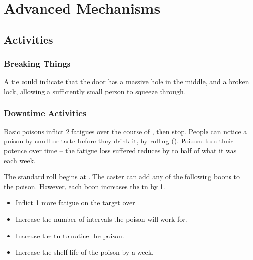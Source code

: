 \chapter{Advanced Mechanisms}

\label{skill_uses}

\section{Activities}

\begin{multicols}{2}

\togglefalse{examplecharacter}

\subsection{Breaking Things}

A tie could indicate that the door has a massive hole in the middle, and a broken lock, allowing a sufficiently small person to squeeze through.


\subsection{Downtime Activities}



Basic poisons inflict 2 \glspl{fatigue} over the course of , then stop.
People can notice a poison by smell or taste before they drink it, by rolling  (\tn[7]).
Poisons lose their potence over time -- the \gls{fatigue} loss suffered reduces by to half of what it was each week.

The standard roll begins at \tn[7].
The caster can add any of the following boons to the poison.
However, each boon increases the \gls{tn} by 1.

\begin{itemize}
  \item
  Inflict 1 more \gls{fatigue} on the target over .
  \item
  Increase the number of \glspl{interval} the poison will work for.
  \item
  Increase the \gls{tn} to notice the poison.
  \item
  Increase the shelf-life of the poison by a week.
\end{itemize}


\end{multicols}
